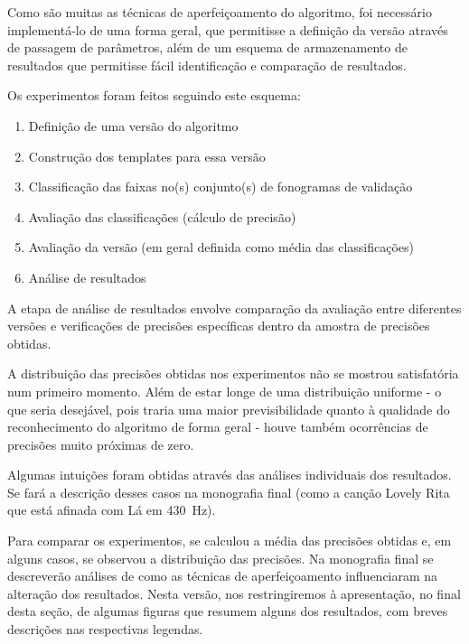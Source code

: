     Como são muitas as técnicas de aperfeiçoamento do algoritmo, foi necessário implementá-lo de uma forma geral, que permitisse a definição da versão através de passagem de parâmetros, além de um esquema de armazenamento de resultados que permitisse fácil identificação e comparação de resultados.
    
    Os experimentos foram feitos seguindo este esquema:
    
    \begin{enumerate}
        \item Definição de uma versão do algoritmo
        \item Construção dos templates para essa versão
        \item Classificação das faixas no(s) conjunto(s) de fonogramas de validação
        \item Avaliação das classificações (cálculo de precisão)
        \item Avaliação da versão (em geral definida como média das classificações)
        \item Análise de resultados
    \end{enumerate}
    
    A etapa de análise de resultados envolve comparação da avaliação entre diferentes versões e verificações de precisões específicas dentro da amostra de precisões obtidas.
    
    A distribuição das precisões obtidas nos experimentos não se mostrou satisfatória num primeiro momento. Além de estar longe de uma distribuição uniforme - o que seria desejável, pois traria uma maior previsibilidade quanto à qualidade do reconhecimento do algoritmo de forma geral - houve também ocorrências de precisões muito próximas de zero.
    
    Algumas intuições foram obtidas através das análises individuais dos resultados. Se fará a descrição desses casos na monografia final (como a canção Lovely Rita que está afinada com Lá em 430~Hz).
    
    Para comparar os experimentos, se calculou a média das precisões obtidas e, em alguns casos, se observou a distribuição das precisões. Na monografia final se descreverão análises de como as técnicas de aperfeiçoamento influenciaram na alteração dos resultados. Nesta versão, nos restringiremos à apresentação, no final desta seção, de algumas figuras que resumem alguns dos resultados, com breves descrições nas respectivas legendas.
    
